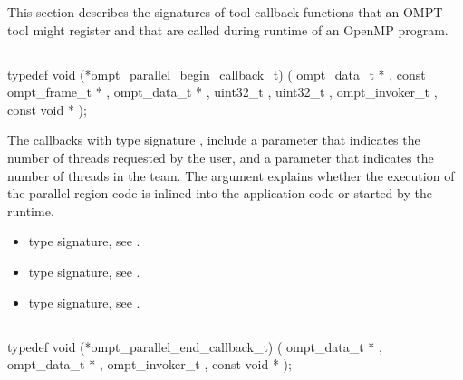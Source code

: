 This section describes the signatures of tool callback functions that an OMPT 
tool might register and that are called during runtime of an OpenMP program.

\subsection{}
\label{subsec:ompt_parallel_begin_callback_t}
\format
\begin{boxedcode}
typedef void (*ompt_parallel_begin_callback_t) (
               ompt_data_t * ,
               const ompt_frame_t * ,  
               ompt_data_t * ,
               uint32_t , 
               uint32_t , 
               ompt_invoker_t , 
               const void *  
);
\end{boxedcode}

\descr
The callbacks with type signature , 
include a parameter  
that indicates the number of threads requested by the user, and a parameter
 that indicates the number of threads in the team.
The  argument explains whether the execution of the parallel
region code is inlined into the application code or started by the runtime.

\crossreferences
\begin{itemize}
\item {} type signature, see 
.
\item {} type signature, see 
.
\item {} type signature, see 
.
\end{itemize}



\subsection{}
\label{subsec:ompt_parallel_end_callback_t}
\format
\begin{boxedcode}
typedef void (*ompt_parallel_end_callback_t) (
               ompt_data_t * ,
               ompt_data_t * ,
               ompt_invoker_t ,
               const void * 
);
\end{boxedcode}

